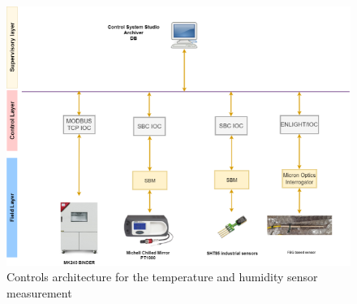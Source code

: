 \begin{figure}[!h]
\centering
\includegraphics[width=0.75\columnwidth]{Chapter5/images/FOS_dcs_scheme.png}
\caption{Controls architecture for the temperature and humidity sensor measurement}
\label{fig:fos_arch}
\end{figure}
